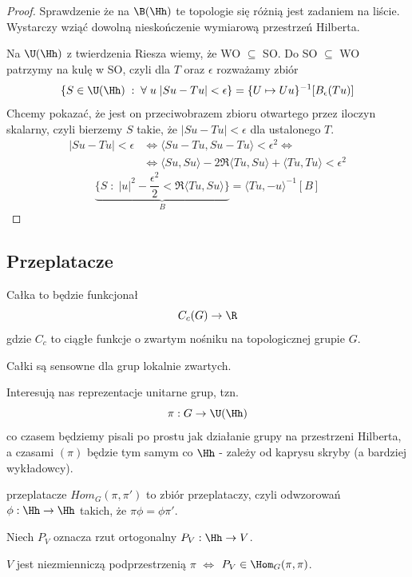 \begin{proof}\color{red}
  Sprawdzenie że na $\B(\Hh)$ te topologie się różnią jest zadaniem na liście. Wystarczy wziąć dowolną nieskończenie wymiarową przestrzeń Hilberta.

  Na $\U(\Hh)$ z twierdzenia Riesza wiemy, że WO $\subseteq$ SO. Do SO $\subseteq$ WO patrzymy na kulę w SO, czyli dla $T$ oraz $\epsilon$ rozważamy zbiór
  $$\{S\in \U(\Hh)\;:\;\forall\;u\;|Su-Tu|<\epsilon\}=\{U\mapsto Uu\}^{-1}[B_\epsilon (Tu)]$$
  Chcemy pokazać, że jest on przeciwobrazem zbioru otwartego przez iloczyn skalarny, czyli bierzemy $S$ takie, że $|Su-Tu|<\epsilon$ dla ustalonego $T$.
  \begin{align*}
    |Su-Tu|<\epsilon &\iff \langle Su-Tu,Su-Tu\rangle <\epsilon^2 \iff \\ 
                     &\iff \langle Su, Su\rangle-2\Re\langle Tu, Su\rangle +\langle Tu, Tu\rangle <\epsilon^2        
  \end{align*}
  $$\underbrace{\{S\;:\;|u|^2-\frac{\epsilon^2}{2}<\Re\langle Tu,Su\rangle\}}_B=\langle Tu, -u\rangle^{-1}[B]$$
\end{proof}

\subsection{Przeplatacze}

Całka to będzie funkcjonał
$$C_c(G)\to \R$$
gdzie $C_c$ to ciągłe funkcje o zwartym nośniku na topologicznej grupie $G$.

{\color{red}
Całki są sensowne dla grup lokalnie zwartych.
}

Interesują nas reprezentacje unitarne grup, tzn.
$$\pi:G\to \U(\Hh)$$
co czasem będziemy pisali po prostu jak działanie grupy na przestrzeni Hilberta, a czasami $(\pi)$ będzie tym samym co $\Hh$ - zależy od kaprysu skryby (a bardziej wykładowcy).

\begin{definition}{przeplatacze}{}\color{red}
  $Hom_G(\pi, \pi')$ to zbiór przeplataczy, czyli odwzorowań $\phi:\Hh\to\Hh$ takich, że $\pi\phi = \phi \pi'$.
\end{definition}

\begin{lemma}{}{}
  Niech $P_V$ oznacza rzut ortogonalny $P_V:\Hh\to V$.
  
  $V$ jest niezmienniczą podprzestrzenią $\pi$ $\iff$ $P_V\in \Hom_G(\pi, \pi)$.
\end{lemma}

